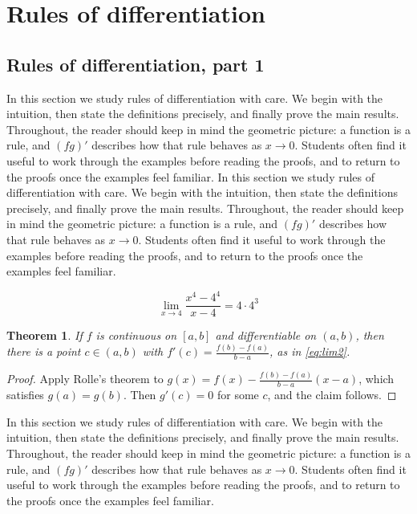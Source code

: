 \documentclass[11pt]{article}
\newtheorem{theorem}{Theorem}[section]
\begin{document}
\section{Rules of differentiation}

\subsection{Rules of differentiation, part 1}

In this section we study rules of differentiation with care. We begin with the intuition, then state the definitions precisely, and finally prove the main results. Throughout, the reader should keep in mind the geometric picture: a function is a rule, and $(fg)'$ describes how that rule behaves as $x \to 0$. Students often find it useful to work through the examples before reading the proofs, and to return to the proofs once the examples feel familiar. In this section we study rules of differentiation with care. We begin with the intuition, then state the definitions precisely, and finally prove the main results. Throughout, the reader should keep in mind the geometric picture: a function is a rule, and $(fg)'$ describes how that rule behaves as $x \to 0$. Students often find it useful to work through the examples before reading the proofs, and to return to the proofs once the examples feel familiar. 

\begin{equation}
  \lim_{x \to 4} \frac{x^{4} - 4^{4}}{x - 4} = 4 \cdot 4^{3}
  \label{eq:lim2}
\end{equation}

\begin{theorem}
If $f$ is continuous on $[a,b]$ and differentiable on $(a,b)$, then there is a point $c \in (a,b)$ with $f'(c) = \frac{f(b)-f(a)}{b-a}$, as in \eqref{eq:lim2}.
\end{theorem}

\begin{proof}
Apply Rolle's theorem to $g(x) = f(x) - \frac{f(b)-f(a)}{b-a}(x-a)$, which satisfies $g(a) = g(b)$. Then $g'(c) = 0$ for some $c$, and the claim follows.
\end{proof}

In this section we study rules of differentiation with care. We begin with the intuition, then state the definitions precisely, and finally prove the main results. Throughout, the reader should keep in mind the geometric picture: a function is a rule, and $(fg)'$ describes how that rule behaves as $x \to 0$. Students often find it useful to work through the examples before reading the proofs, and to return to the proofs once the examples feel familiar. 
\end{document}
